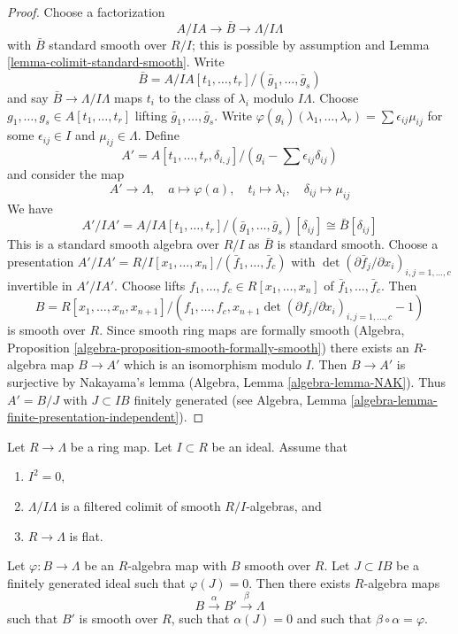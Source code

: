 \begin{proof}
Choose a factorization
$$
A/IA \to \bar B \to \Lambda/I\Lambda
$$
with $\bar B$ standard smooth over $R/I$; this is possible by
assumption and Lemma \ref{lemma-colimit-standard-smooth}. Write
$$
\bar B = A/IA[t_1, \ldots, t_r]/(\bar g_1, \ldots, \bar g_s)
$$
and say $\bar B \to \Lambda/I\Lambda$ maps $t_i$ to the class
of $\lambda_i$ modulo $I\Lambda$. Choose
$g_1, \ldots, g_s \in A[t_1, \ldots, t_r]$ lifting
$\bar g_1, \ldots, \bar g_s$. Write
$\varphi(g_i)(\lambda_1, \ldots, \lambda_r) =
\sum \epsilon_{ij} \mu_{ij}$
for some $\epsilon_{ij} \in I$ and $\mu_{ij} \in \Lambda$. Define
$$
A' = A[t_1, \ldots, t_r, \delta_{i, j}]/
(g_i - \sum \epsilon_{ij} \delta_{ij})
$$
and consider the map
$$
A' \longrightarrow \Lambda,\quad
a \longmapsto \varphi(a),\quad
t_i \longmapsto \lambda_i,\quad
\delta_{ij} \longmapsto \mu_{ij}
$$
We have
$$
A'/IA' = A/IA[t_1, \ldots, t_r]/(\bar g_1, \ldots, \bar g_s)[\delta_{ij}]
\cong \bar B[\delta_{ij}]
$$
This is a standard smooth algebra over $R/I$ as $\bar B$ is standard
smooth. Choose a presentation
$A'/IA' = R/I[x_1, \ldots, x_n]/(\bar f_1, \ldots, \bar f_c)$ with
$\det(\partial \bar f_j/\partial x_i)_{i, j = 1, \ldots, c}$ invertible in
$A'/IA'$. Choose lifts $f_1, \ldots, f_c \in R[x_1, \ldots, x_n]$ of
$\bar f_1, \ldots, \bar f_c$. Then
$$
B = R[x_1, \ldots, x_n, x_{n + 1}]/
(f_1, \ldots, f_c,
x_{n + 1}\det(\partial f_j/\partial x_i)_{i, j = 1, \ldots, c} - 1)
$$
is smooth over $R$. Since smooth ring maps are formally smooth
(Algebra, Proposition \ref{algebra-proposition-smooth-formally-smooth})
there exists an $R$-algebra map $B \to A'$ which is an isomorphism
modulo $I$. Then $B \to A'$ is surjective by Nakayama's lemma
(Algebra, Lemma \ref{algebra-lemma-NAK}).
Thus $A' = B/J$ with $J \subset IB$ finitely generated (see
Algebra, Lemma \ref{algebra-lemma-finite-presentation-independent}).
\end{proof}

\begin{lemma}
\label{lemma-lift-twice}
Let $R \to \Lambda$ be a ring map. Let $I \subset R$ be an ideal.
Assume that
\begin{enumerate}
\item $I^2 = 0$,
\item $\Lambda/I\Lambda$ is a filtered colimit of smooth $R/I$-algebras, and
\item $R \to \Lambda$ is flat.
\end{enumerate}
Let $\varphi : B \to \Lambda$ be an $R$-algebra map with $B$
smooth over $R$. Let $J \subset IB$ be a finitely generated ideal
such that $\varphi(J) = 0$.
Then there exists $R$-algebra maps
$$
B \xrightarrow{\alpha} B' \xrightarrow{\beta} \Lambda
$$
such that $B'$ is smooth over $R$, such that $\alpha(J) = 0$ and
such that $\beta \circ \alpha = \varphi$.
\end{lemma}

